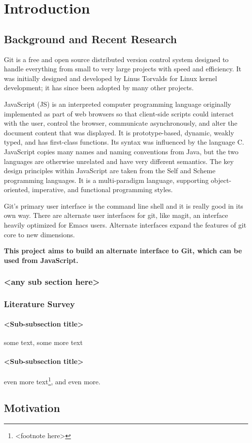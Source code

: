 \chapter{Introduction}

\section{Background and Recent Research}

Git is a free and open source distributed version control system designed to
handle everything from small to very large projects with speed and efficiency.
It was initially designed and developed by Linus Torvalds for Linux kernel
development; it has since been adopted by many other projects.

JavaScript (JS) is an interpreted computer programming language originally
implemented as part of web browsers so that client-side scripts could interact
with the user, control the browser, communicate asynchronously, and alter the
document content that was displayed. It is prototype-based, dynamic, weakly
typed, and has first-class functions. Its syntax was influenced by the language
C. JavaScript copies many names and naming conventions from Java, but the two
languages are otherwise unrelated and have very different semantics. The key
design principles within JavaScript are taken from the Self and Scheme
programming languages. It is a multi-paradigm language, supporting
object-oriented, imperative, and functional programming styles.

Git's primary user interface is the command line shell and it is really good in
its own way. There are alternate user interfaces for git, like
magit\cite{magit}, an interface heavily optimized for Emacs\cite{emacs} users.
Alternate interfaces expand the features of git core to new dimensions.

\textbf{This project aims to build an alternate interface to Git, which can be
  used from JavaScript.}

\subsection{<any sub section here>}

\subsection{Literature Survey}

\subsubsection{<Sub-subsection title>}
some text\cite{citation-1-name-here}, some more text

\subsubsection{<Sub-subsection title>}
even more text\footnote{<footnote here>}, and even more.

\section{Motivation}

